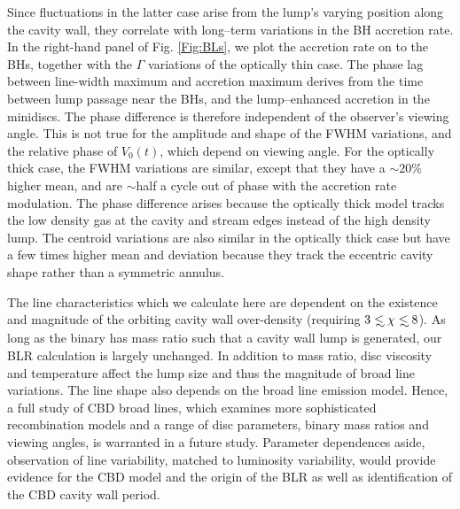 Since fluctuations in the latter case arise from the lump's varying
position along the cavity wall, they correlate with long--term
variations in the BH accretion rate. In the right-hand panel of
Fig. \ref{Fig:BLs}, we plot the accretion rate on to the BHs, together
with the $\Gamma$ variations of the optically thin case. The phase lag
between line-width maximum and accretion maximum derives from the time
between lump passage near the BHs, and the lump--enhanced accretion in
the minidiscs. The phase difference is therefore independent of the
observer's viewing angle. This is not true for the amplitude and shape
of the FWHM variations, and the relative phase of $V_0(t)$, which
depend on viewing angle. For the optically thick case, the FWHM
variations are similar, except that they have a $\sim20\%$ higher
mean, and are $\sim$half a cycle out of phase with the accretion rate
modulation. The phase difference arises because the optically thick
model tracks the low density gas at the cavity and stream edges
instead of the high density lump. The centroid variations are also
similar in the optically thick case but have a few times higher mean
and deviation because they track the eccentric cavity shape rather
than a symmetric annulus.

The line characteristics which we calculate here are dependent on the
existence and magnitude of the orbiting cavity wall over-density
(requiring $3 \lsim \chi \lsim 8$). As long as the binary has mass
ratio such that a cavity wall lump is generated, our BLR calculation
is largely unchanged. In addition to mass ratio, disc viscosity and
temperature affect the lump size and thus the magnitude of broad line
variations. The line shape also depends on the broad line emission
model. Hence, a full study of CBD broad lines, which examines more
sophisticated recombination models and a range of disc parameters,
binary mass ratios and viewing angles, is warranted in a future study.
Parameter dependences aside, observation of line variability, matched
to luminosity variability, would provide evidence for the CBD model
and the origin of the BLR as well as identification of the CBD cavity
wall period.






